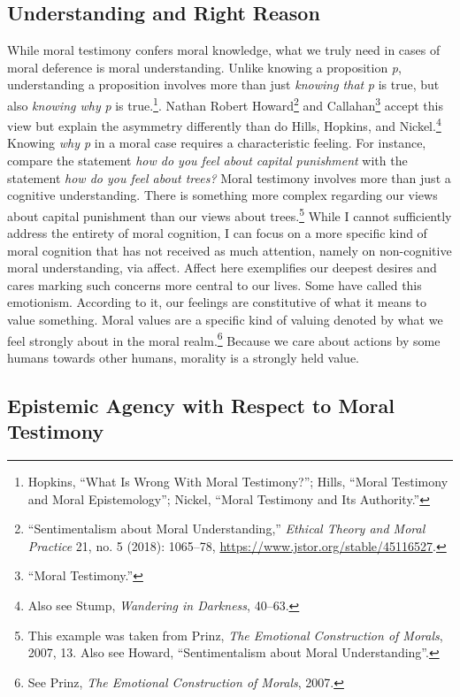 \documentclass[phdthesis,12pt,final,a4paper]{wuthesis}
\theoremstyle{definition}
\theoremstyle{definition}
\theoremstyle{definition}
\theoremstyle{definition}
\theoremstyle{remark}
\begin{document}
\subsection*{Understanding and Right Reason}\label{understanding-and-right-reason}

While moral testimony confers moral knowledge, what we truly need in cases of moral deference is moral understanding. Unlike knowing a proposition \emph{p}, understanding a proposition involves more than just \emph{knowing that} \emph{p} is true, but also \emph{knowing why} \emph{p} is true.\footnote{Hopkins, {``What {Is Wrong With Moral Testimony}?''}; Hills, {``Moral Testimony and Moral Epistemology''}; Nickel, {``Moral {Testimony} and Its {Authority}.''}}. Nathan Robert Howard\footnote{{``Sentimentalism about {Moral Understanding},''} \emph{Ethical Theory and Moral Practice} 21, no. 5 (2018): 1065--78, \url{https://www.jstor.org/stable/45116527}.} and Callahan\footnote{{``Moral {Testimony}.''}} accept this view but explain the asymmetry differently than do Hills, Hopkins, and Nickel.\footnote{Also see Stump, \emph{Wandering in {Darkness}}, 40--63.} Knowing \emph{why p} in a moral case requires a characteristic feeling. For instance, compare the statement \emph{how do you feel about capital punishment} with the statement \emph{how do you feel about trees?} Moral testimony involves more than just a cognitive understanding. There is something more complex regarding our views about capital punishment than our views about trees.\footnote{This example was taken from Prinz, \emph{The {Emotional Construction} of {Morals}}, 2007, 13. Also see Howard, {``Sentimentalism about {Moral Understanding}''}.} While I cannot sufficiently address the entirety of moral cognition, I can focus on a more specific kind of moral cognition that has not received as much attention, namely on non-cognitive moral understanding, via affect. Affect here exemplifies our deepest desires and cares marking such concerns more central to our lives. Some have called this emotionism. According to it, our feelings are constitutive of what it means to value something. Moral values are a specific kind of valuing denoted by what we feel strongly about in the moral realm.\footnote{See Prinz, \emph{The {Emotional Construction} of {Morals}}, 2007.} Because we care about actions by some humans towards other humans, morality is a strongly held value.

\subsection*{Epistemic Agency with Respect to Moral Testimony}\label{epistemic-agency-with-respect-to-moral-testimony}
\end{document}
